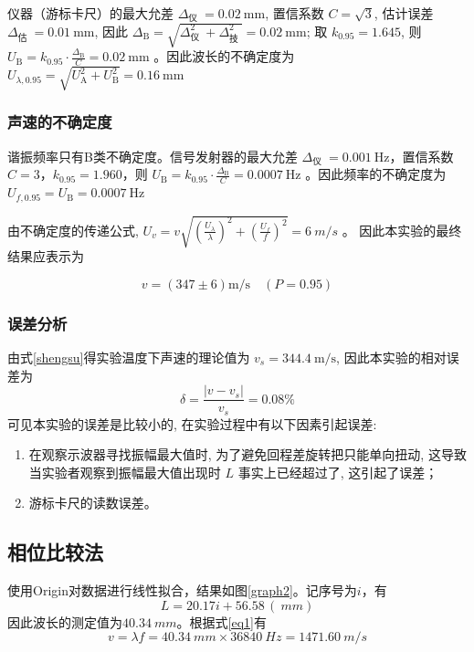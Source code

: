 \documentclass{article}
\begin{document}
仪器（游标卡尺）的最大允差 $\Delta_{\text {仪 }}=0.02 \mathrm{~mm}$, 置信系数 $C=\sqrt{3}$, 估计误差 $\Delta_{\text {估 }}=0.01 \mathrm{~mm}$, 因此 $\Delta_{\mathrm{B}}=\sqrt{\Delta_{\text {仪 }}^2+\Delta_{\text {技 }}^2}=0.02 \mathrm{~mm}$; 取 $k_{0.95}=1.645$, 则 $U_{\mathrm{B}}=k_{0.95} \cdot \frac{\Delta_{\mathrm{B}}}{C}=0.02 \mathrm{~mm}$ 。因此波长的不确定度为 $U_{\lambda, 0.95}=\sqrt{U_{\mathrm{A}}^2+U_{\mathrm{B}}^2}=0.16 \mathrm{~mm}$

\subsubsection*{声速的不确定度}

谐振频率只有B类不确定度。信号发射器的最大允差 $\Delta_{\text {仪 }}=0.001 \mathrm{~Hz}$，置信系数 $C=3$，$k_{0.95}=1.960$，则 $U_{\mathrm{B}}=k_{0.95} \cdot \frac{\Delta_{\mathrm{B}}}{C}=0.0007 \mathrm{~Hz}$ 。因此频率的不确定度为 $U_{f, 0.95}=U_{\mathrm{B}}=0.0007 \mathrm{~Hz}$

由不确定度的传递公式, $U_v=v \sqrt{\left(\frac{U_\lambda}{\lambda}\right)^2+\left(\frac{U_f}{f}\right)^2}=\SI{6}{m/s}$ 。
因此本实验的最终结果应表示为

$$
    v=(347 \pm 6) \mathrm{m} / \mathrm{s}\quad( P=0.95)
$$
\subsubsection*{误差分析}
由式\eqref{shengsu}得实验温度下声速的理论值为 $v_s=344.4 \mathrm{~m} / \mathrm{s}$, 因此本实验的相对误差为
$$
    \delta=\frac{\left|v-v_s\right|}{v_s}=0.08\%
$$
可见本实验的误差是比较小的, 在实验过程中有以下因素引起误差:
\begin{enumerate}
    \item 在观察示波器寻找振幅最大值时, 为了避免回程差旋转把只能单向扭动, 这导致当实验者观察到振幅最大值出现时 $L$ 事实上已经超过了, 这引起了误差；
    \item 游标卡尺的读数误差。
\end{enumerate}


\subsection*{相位比较法}
使用Origin对数据进行线性拟合，结果如图\ref{graph2}。记序号为$i$，有 
\[L=20.17i+56.58\,(\SI{}{mm})\]
因此波长的测定值为$\SI{40.34}{mm}$。根据式\eqref{eq1}有
\[v=\lambda f=\SI{40.34}{mm}\times \SI{36840}{Hz}=\SI{1471.60}{m/s}\]
\end{document}
